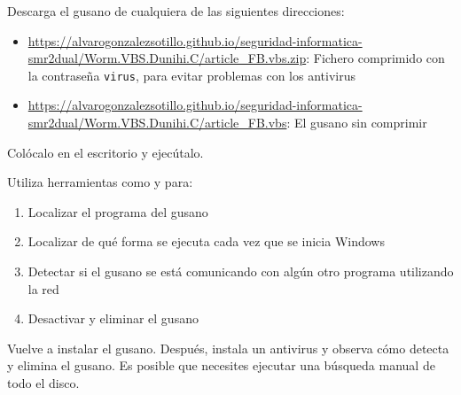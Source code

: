 \begin{homeworkProblem}
  Descarga el gusano de cualquiera de las siguientes direcciones:
  \begin{itemize}
  \item \url{https://alvarogonzalezsotillo.github.io/seguridad-informatica-smr2dual/Worm.VBS.Dunihi.C/article_FB.vbs.zip}: Fichero comprimido con la contraseña \texttt{virus}, para evitar problemas con los antivirus
  \item \url{https://alvarogonzalezsotillo.github.io/seguridad-informatica-smr2dual/Worm.VBS.Dunihi.C/article_FB.vbs}: El gusano sin comprimir
  \end{itemize}

  Colócalo en el escritorio y ejecútalo.
\end{homeworkProblem}

\begin{homeworkProblem}
  Utiliza herramientas como  y  para:
  \begin{enumerate}
  \item Localizar el programa del gusano
  \item Localizar de qué forma se ejecuta cada vez que se inicia Windows
  \item Detectar si el gusano se está comunicando con algún otro programa utilizando la red
  \item Desactivar y eliminar el gusano
  \end{enumerate}

\end{homeworkProblem}


\begin{homeworkProblem}
  Vuelve a instalar el gusano. Después, instala un antivirus y observa cómo detecta y elimina el gusano. Es posible que necesites ejecutar una búsqueda manual de todo el disco.
\end{homeworkProblem}

